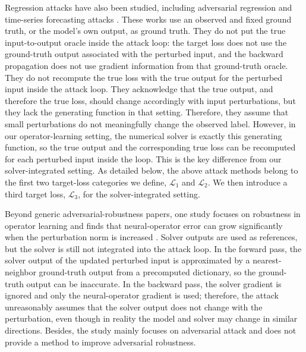 \documentclass[letterpaper]{article} %
\begin{document}
Regression attacks have also been studied, including adversarial regression and
time-series forecasting attacks
\citep{nguyen2018regression,tong2018adversarialregression,ribeiro2023linearregression,mode2020mtsregression,liu2022forecastingattacks}.
These works use an observed and fixed ground truth, or the model's own output,
as ground truth. They do not put the true input-to-output oracle inside the
attack loop: the target loss does not use the ground-truth output associated
with the perturbed input, and the backward propagation does not use gradient
information from that ground-truth oracle. They do not recompute the true loss
with the true output for the perturbed input inside the attack loop. They
acknowledge that the true output, and therefore the true loss, should change
accordingly with input perturbations, but they lack the generating function in
that setting. Therefore, they assume that small perturbations do not
meaningfully change the observed label. However, in our operator-learning
setting, the numerical solver is exactly this generating function, so the true
output and the corresponding true loss can be recomputed for each perturbed
input inside the loop. This is the key difference from our solver-integrated
setting. As detailed below, the above attack methods belong to the first two
target-loss categories we define, $\mathcal{L}_1$ and $\mathcal{L}_2$. We then
introduce a third target loss, $\mathcal{L}_3$, for the solver-integrated
setting.

Beyond generic adversarial-robustness papers, one study focuses on robustness
in operator learning and finds that neural-operator error can grow significantly
when the perturbation norm is increased \citep{adesoji2022evaluating}. Solver
outputs are used as references, but the solver is still not integrated into the
attack loop. In the forward pass, the solver output of the updated perturbed
input is approximated by a nearest-neighbor ground-truth output from a
precomputed dictionary, so the ground-truth output can be inaccurate. In the
backward pass, the solver gradient is ignored and only the neural-operator
gradient is used; therefore, the attack unreasonably assumes that the solver
output does not change with the perturbation, even though in reality the model
and solver may change in similar directions. Besides, the study mainly focuses
on adversarial attack and does not provide a method to improve adversarial
robustness.
\end{document}
